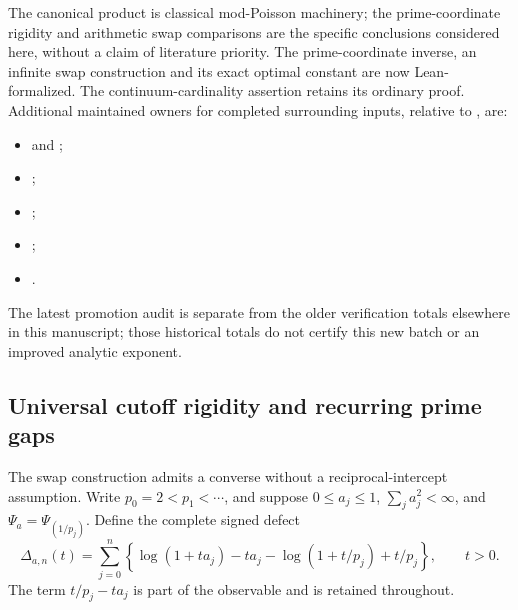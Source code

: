 \documentclass[11pt]{article}
\theoremstyle{definition}
\begin{document}
The canonical product is classical mod-Poisson machinery; the
prime-coordinate rigidity and arithmetic swap comparisons are the
specific conclusions considered here, without a claim of literature
priority. The prime-coordinate inverse, an infinite swap construction
and its exact optimal constant are now Lean-formalized. The
continuum-cardinality assertion retains its ordinary proof.
Additional maintained owners for completed surrounding inputs, relative to
, are:
\begin{itemize}\small
\item {} and
      ;
\item {};
\item {};
\item {};
\item {}.
\end{itemize}
The latest promotion audit is separate from the older verification totals
elsewhere in this manuscript; those historical totals do not certify this
new batch or an improved analytic exponent.

\subsection{Universal cutoff rigidity and recurring prime gaps}

The swap construction admits a converse without a reciprocal-intercept
assumption. Write $p_0=2<p_1<\cdots$, and suppose
$0\le a_j\le1$, $\sum_j a_j^2<\infty$, and
$\Psi_a=\Psi_{(1/p_j)}$. Define the complete signed defect
\[
 \Delta_{a,n}(t)=\sum_{j=0}^{n}
 \left\{\log(1+ta_j)-ta_j-
          \log(1+t/p_j)+t/p_j\right\},\qquad t>0.
\]
The term $t/p_j-ta_j$ is part of the observable and is retained throughout.
\end{document}
